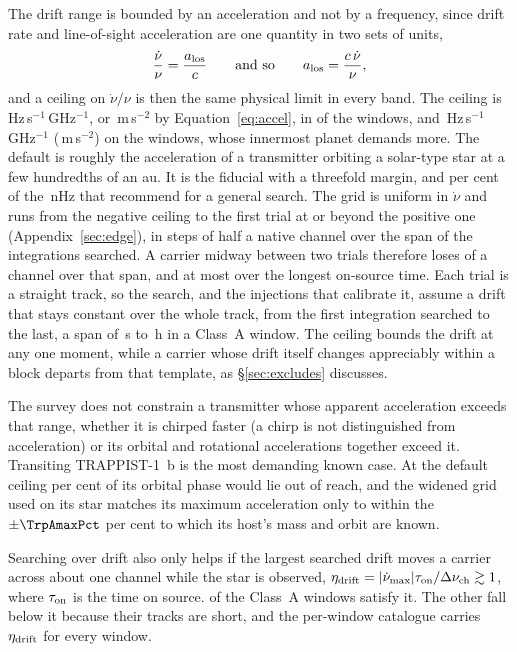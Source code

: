 The drift range is bounded by an acceleration and not by a frequency, since
drift rate and line-of-sight acceleration are one quantity in two sets of
units,
%
\begin{equation}
\frac{\dot\nu}{\nu}=\frac{a_{\rm los}}{c}
\qquad\text{and so}\qquad
a_{\rm los}=\frac{c\,\dot\nu}{\nu},
\label{eq:accel}
\end{equation}
%
and a ceiling on $\dot\nu/\nu$ is then the same physical limit in every band.
The ceiling is \DriftCeilLo\,Hz\,s$^{-1}$\,GHz$^{-1}$, or
\AccelCeilMed\,m\,s$^{-2}$ by Equation~\ref{eq:accel}, in \AccelNDefault{} of
the \NWinA{} windows, and \DriftCeilHi\,Hz\,s$^{-1}$\,GHz$^{-1}$
(\AccelCeilMax\,m\,s$^{-2}$) on the \AccelNWide{} \AccelWideStar{} windows,
whose innermost planet demands more. The default is roughly the acceleration
of a transmitter orbiting a solar-type star at a few hundredths of an au. It
is the \citet{Mason2025} fiducial with a threefold margin, and
\AccelSheikhPct{} per cent of the \AccelSheikhNHz\,nHz that
\citet{Sheikh2019} recommend for a general search. The grid is uniform in
$\dot\nu$ and runs from the negative ceiling to the first trial at or beyond
the positive one (Appendix~\ref{sec:edge}), in steps of half a native channel
over the span of the integrations searched. A carrier midway between two
trials therefore loses \DriftGridSpanHalf{} of a channel over that span, and
at most \DriftGridFineHalf{} over the longest on-source time. Each trial is a
straight track, so the search, and the injections that calibrate it, assume
a drift that stays constant over the whole track, from the first integration
searched to the last, a span of \AcTrackLoS\,s to \AcTrackHiH\,h in a Class~A
window. The ceiling bounds the
drift at any one moment, while a carrier whose drift itself changes
appreciably within a block departs from that template, as
\S\ref{sec:excludes} discusses.

The survey does not constrain a transmitter whose apparent
acceleration exceeds that range, whether it is chirped faster (a chirp is
not distinguished from acceleration) or its orbital and
rotational accelerations together exceed it. Transiting TRAPPIST-1~b is the
most demanding known case. At the default ceiling \TrapPhaseHi{} per cent of
its orbital phase would lie out of reach, and the widened grid used on its
star matches its maximum acceleration only to within the $\pm\TrpAmaxPct$ per
cent to which its host's mass and orbit are known.

Searching over drift also only helps if the largest searched drift moves a
carrier across about one channel while the star is observed,
$\eta_{\rm drift}=|\dot\nu_{\max}|\tau_{\rm on}/\Delta\nu_{\rm ch}\gtrsim1$,
where $\tau_{\rm on}$ is the time on source. \EtaDriftAOk{} of the \NWinA{}
Class~A windows satisfy it. The other \EtaDriftALo{} fall below it because
their tracks are short, and the per-window catalogue carries
$\eta_{\rm drift}$ for every window.

